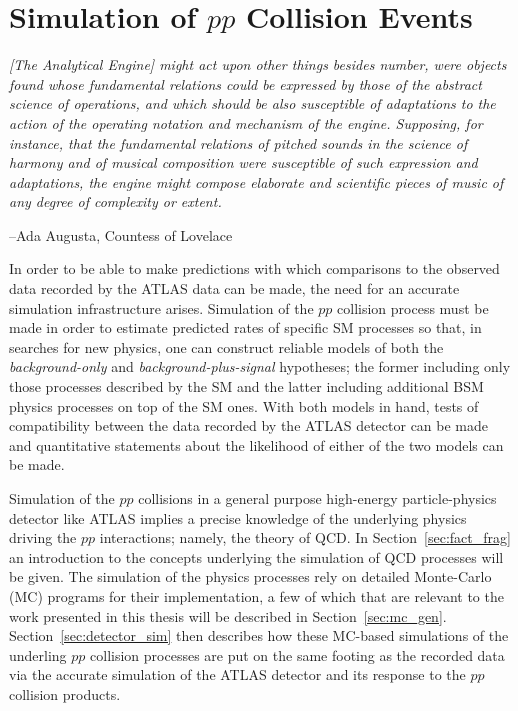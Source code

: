 \chapter{Simulation of $pp$ Collision Events}
\label{chap:simulation}


\epigraph{\textit{[The Analytical Engine] might act upon other things besides number, were objects found whose
fundamental relations could be expressed by those of the abstract science of operations, and which should be also susceptible
of adaptations to the action of the operating notation and mechanism of the engine. Supposing, for instance, that the
fundamental relations of pitched sounds in the science of harmony and of musical composition were susceptible of such
expression and adaptations, the engine might compose elaborate and scientific pieces of music of any degree of
complexity or extent.}}{--Ada Augusta, Countess of Lovelace}


In order to be able to make predictions with which comparisons to the observed data
recorded by the ATLAS data can be made, the need for an accurate simulation infrastructure
arises.
Simulation of the $pp$ collision process must be made in order to estimate predicted
rates of specific SM processes so that, in searches for new physics, one can
construct reliable models of both the \textit{background-only} and \textit{background-plus-signal}
hypotheses; the former including only those processes described by the SM and the latter
including additional BSM physics processes on top of the SM ones.
With both models in hand, tests of compatibility between the data recorded by the ATLAS detector
can be made and quantitative statements about the likelihood of either of the two models can be made.

Simulation of the $pp$ collisions in a general purpose high-energy particle-physics detector
like ATLAS implies a precise knowledge of the underlying physics driving the $pp$ interactions; namely,
the theory of QCD.
In Section~\ref{sec:fact_frag} an introduction to the concepts underlying the simulation of QCD
processes will be given.
The simulation of the physics processes rely on detailed Monte-Carlo (MC) programs for their implementation,
a few of which that are relevant to the work presented in this thesis will be described in Section~\ref{sec:mc_gen}.
Section~\ref{sec:detector_sim} then describes how these MC-based simulations of the underling $pp$ collision processes
are put on the same footing as the recorded data via the accurate simulation of the ATLAS
detector and its response to the $pp$ collision products.

